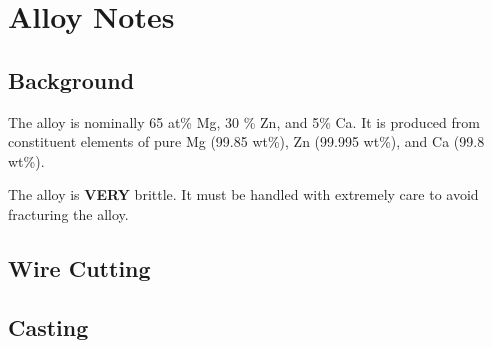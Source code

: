 \section{\MgZnCa Alloy Notes}

\subsection{Background}

The \MgZnCa alloy is nominally 65 at\% Mg, 30 \% Zn, and 5\% Ca. It is produced from constituent elements of pure Mg (99.85 wt\%), Zn (99.995 wt\%), and Ca (99.8 wt\%). 

The \MgZnCa alloy is \textbf{VERY} brittle. It must be handled with extremely care to avoid fracturing the alloy. 

\subsection{Wire Cutting}


\subsection{Casting}

